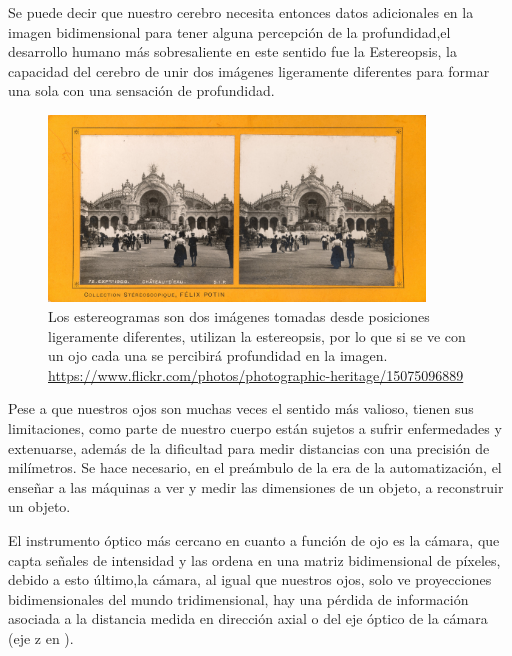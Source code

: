\documentclass[UTF8]{article}
\begin{document}
Se puede decir que nuestro cerebro necesita entonces datos adicionales en la imagen bidimensional para tener alguna percepción de la profundidad,el desarrollo humano más sobresaliente en este sentido fue la Estereopsis, la capacidad del cerebro de unir dos imágenes ligeramente diferentes para formar una sola con una sensación de profundidad.

\medskip

\begin{figure}[h]
\includegraphics[width=10cm]{StereogramFrance.jpg}
\centering
\caption{Los estereogramas son dos imágenes tomadas desde posiciones ligeramente diferentes, utilizan la estereopsis, por lo que si se ve con un ojo cada una se percibirá profundidad en la imagen. \url{https://www.flickr.com/photos/photographic-heritage/15075096889}}
\label{im1}
\end{figure}


Pese a que nuestros ojos son muchas veces el sentido más valioso, tienen sus limitaciones, como parte de nuestro cuerpo  están sujetos a sufrir enfermedades y extenuarse, además de la dificultad para medir distancias con una precisión de milímetros. Se hace necesario, en el preámbulo de la era de la automatización, el enseñar a las máquinas a ver y medir las dimensiones de un objeto, a reconstruir un objeto.

El instrumento óptico más cercano en cuanto a función de ojo es la cámara, que capta señales de intensidad y las ordena en una matriz bidimensional de píxeles, debido a esto último,la cámara, al igual que nuestros ojos, solo ve proyecciones bidimensionales del mundo tridimensional, hay una pérdida de información asociada a la distancia medida en dirección axial o del eje óptico de la cámara (eje z en ).
\end{document}

